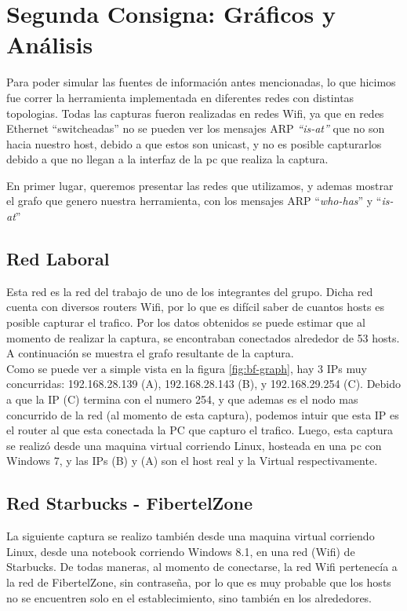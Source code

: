 \section{Segunda Consigna: Gráficos y Análisis}

Para poder simular las fuentes de información antes mencionadas, lo que hicimos fue correr la herramienta implementada en diferentes redes con distintas topologias. Todas las capturas fueron realizadas en redes Wifi, ya que en redes Ethernet ``switcheadas'' no se pueden ver los mensajes ARP \textit{``is-at''} que no son hacia nuestro host, debido a que estos son unicast, y no es posible capturarlos debido a que no llegan a la interfaz de la pc que realiza la captura. 

En primer lugar, queremos presentar las redes que utilizamos, y ademas mostrar el grafo que genero nuestra herramienta, con los mensajes ARP ``\textit{who-has}'' y ``\textit{is-at}''

\subsection{Red Laboral}

Esta red es la red del trabajo de uno de los integrantes del grupo. Dicha red cuenta con diversos routers Wifi, por lo que es difícil saber de cuantos hosts es posible capturar el trafico. Por los datos obtenidos se puede estimar que al momento de realizar la captura, se encontraban conectados alrededor de 53 hosts. A continuación se muestra el grafo resultante de la captura. \\

Como se puede ver a simple vista en la figura \ref{fig:bf-graph}, hay 3 IPs muy concurridas: 192.168.28.139 (A), 192.168.28.143 (B), y 192.168.29.254 (C). Debido a que la IP (C) termina con el numero 254, y que ademas es el nodo mas concurrido de la red (al momento de esta captura), podemos intuir que esta IP es el router al que esta conectada la PC que capturo el trafico. Luego, esta captura se realizó desde una maquina virtual corriendo Linux, hosteada en una pc con Windows 7, y las IPs (B) y (A) son el host real y la Virtual respectivamente.

\FloatBarrier
\subsection{Red Starbucks - FibertelZone}

La siguiente captura se realizo también desde una maquina virtual corriendo Linux, desde una notebook corriendo Windows 8.1, en una red (Wifi) de Starbucks. De todas maneras, al momento de conectarse, la red Wifi pertenecía a la red de FibertelZone, sin contraseña, por lo que es muy probable que los hosts no se encuentren solo en el establecimiento, sino también en los alrededores. \\

